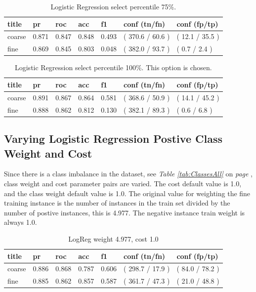 \documentclass[ms]{nuthesis}
\begin{document}
\FloatBarrier
\begin{table}[H]
\centering
\begin{tabular}{|l||l||l||l||l||l||l|}\toprule
title & pr & roc & acc & f1 & conf (tn/fn) & conf (fp/tp) \\ \midrule
coarse & 0.871 & 0.847 & 0.848 & 0.493 & ( 370.6 / 60.6 ) & ( 12.1 / 35.5 ) \\
fine & 0.869 & 0.845 & 0.803 & 0.048 & ( 382.0 / 93.7 ) & ( 0.7 / 2.4 ) \\ \bottomrule
\end{tabular}
\caption{Logistic Regression select percentile 75\%.}
\label{tab:LogRegSel75}
\end{table}
\FloatBarrier


\FloatBarrier
\begin{table}[H]
\centering
\begin{tabular}{|l||l||l||l||l||l||l|}\toprule
title & pr & roc & acc & f1 & conf (tn/fn) & conf (fp/tp) \\ \midrule
coarse & 0.891 & 0.867 & 0.864 & 0.581 & ( 368.6 / 50.9 ) & ( 14.1 / 45.2 ) \\
fine & 0.888 & 0.862 & 0.812 & 0.130 & ( 382.1 / 89.3 ) & ( 0.6 / 6.8 ) \\ \bottomrule
\end{tabular}
\caption{Logistic Regression select percentile 100\%. This option is chosen.}
\label{tab:LogRegMinMax}
\end{table}
\FloatBarrier


\subsection{Varying Logistic Regression Postive Class Weight and Cost}
\par Since there is a class imbalance in the dataset, see \textit{Table \ref{tab:ClassesAll} } on
\textit{page \pageref{tab:ClassesAll}}, class weight and cost parameter pairs are varied.  The cost
default value is 1.0, and the class weight default value is 1.0. The original value for weighting the
fine training instance is the number of instances in the train set divided by the number of postive
instances, this is 4.977. The negative instance train weight is always 1.0.

\FloatBarrier
\begin{table}[H]
\centering
\begin{tabular}{|l||l||l||l||l||l||l|}\toprule
title & pr & roc & acc & f1 & conf (tn/fn) & conf (fp/tp) \\ \midrule
coarse & 0.886 & 0.868 & 0.787 & 0.606 & ( 298.7 / 17.9 ) & ( 84.0 / 78.2 ) \\
fine & 0.885 & 0.862 & 0.857 & 0.587 & ( 361.7 / 47.3 ) & ( 21.0 / 48.8 ) \\ \bottomrule
\end{tabular}
\caption{LogReg weight 4.977, cost 1.0}
\label{tab:LogRegWtOrig-C1}
\end{table}
\FloatBarrier
\end{document}
